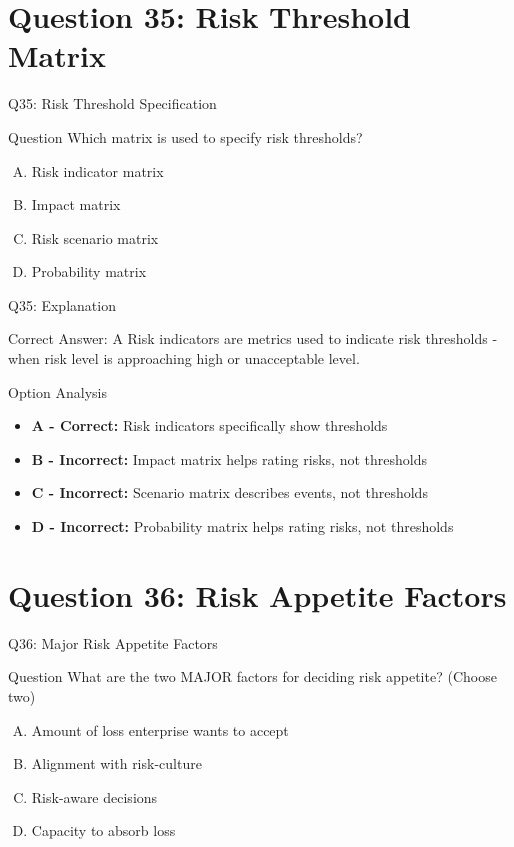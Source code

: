 \documentclass{beamer}
\begin{document}
	\section{Question 35: Risk Threshold Matrix}
	
	\begin{frame}{Q35: Risk Threshold Specification}
		\begin{block}{Question}
			Which matrix is used to specify risk thresholds?
		\end{block}
		\begin{enumerate}[(A)]
			\item Risk indicator matrix
			\item Impact matrix
			\item Risk scenario matrix
			\item Probability matrix
		\end{enumerate}
	\end{frame}
	
	\begin{frame}{Q35: Explanation}
		\begin{block}{Correct Answer: A}
			Risk indicators are metrics used to indicate risk thresholds - when risk level is approaching high or unacceptable level.
		\end{block}
		\begin{block}{Option Analysis}
			\begin{itemize}
				\item \textbf{A - Correct:} Risk indicators specifically show thresholds
				\item \textbf{B - Incorrect:} Impact matrix helps rating risks, not thresholds
				\item \textbf{C - Incorrect:} Scenario matrix describes events, not thresholds
				\item \textbf{D - Incorrect:} Probability matrix helps rating risks, not thresholds
			\end{itemize}
		\end{block}
	\end{frame}
	
	\section{Question 36: Risk Appetite Factors}
	
	\begin{frame}{Q36: Major Risk Appetite Factors}
		\begin{block}{Question}
			What are the two MAJOR factors for deciding risk appetite? (Choose two)
		\end{block}
		\begin{enumerate}[(A)]
			\item Amount of loss enterprise wants to accept
			\item Alignment with risk-culture
			\item Risk-aware decisions
			\item Capacity to absorb loss
		\end{enumerate}
	\end{frame}
	
\end{document}
